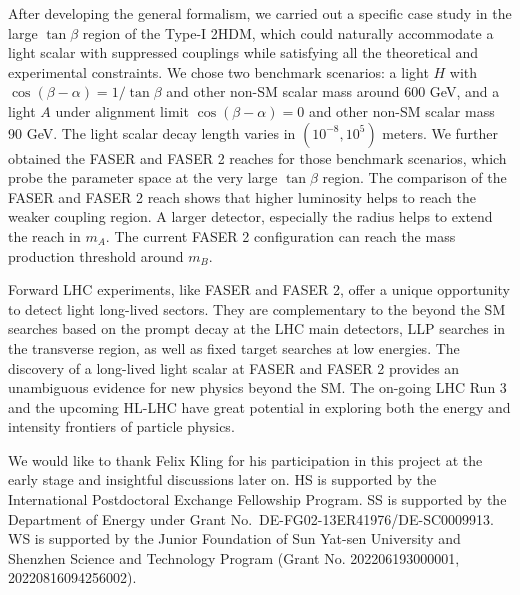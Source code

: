 \documentclass[letterpaper,11pt]{article}
\newcommand{\tanb}{\tan \beta}
\def\cosba{\cos(\beta-\alpha)}
\begin{document}
{After developing the general formalism, we carried out a specific case study in the large $\tan\beta$ region of the Type-I 2HDM, which could naturally accommodate a light scalar with suppressed couplings while satisfying all the theoretical and experimental constraints. We chose two benchmark scenarios: a light $H$ with $\cosba=1/\tanb$ and other non-SM scalar mass around 600 GeV, and a light $A$  under alignment limit $\cosba=0$ and other non-SM scalar mass 90 GeV.  The light scalar decay length varies in $(10^{-8}, 10^5)$ meters. We further  obtained the FASER and FASER 2 reaches for those benchmark scenarios, which probe the parameter space at the very large $\tan\beta$ region.  The comparison of the FASER and FASER 2 reach shows that higher luminosity helps to  reach the weaker coupling region. A larger detector, especially the radius helps to extend the reach in $m_A$. The current FASER 2 configuration can reach the mass production threshold around $m_B$. 
 

Forward LHC experiments, like FASER and FASER 2, offer a unique opportunity to detect light long-lived sectors.    They are complementary to the beyond the SM  searches based on  the prompt decay at the LHC main detectors, LLP searches in the transverse region, as well as fixed target searches at low energies.  The discovery of a long-lived light scalar at FASER and FASER 2 provides an unambiguous evidence for new physics beyond the SM. The on-going LHC Run 3 and the upcoming HL-LHC have great potential in exploring both the energy and intensity frontiers of particle physics. 


\begin{acknowledgments}


We would like to thank Felix Kling for his participation in this project at the early stage and insightful discussions later on. HS is supported by the International Postdoctoral Exchange Fellowship Program. 
SS is supported  by the Department of Energy under Grant No.~DE-FG02-13ER41976/DE-SC0009913.
WS is supported by the Junior Foundation of Sun Yat-sen University and Shenzhen Science and Technology Program (Grant No. 202206193000001, 20220816094256002).  

\end{acknowledgments}

\appendix 

}
\end{document}
